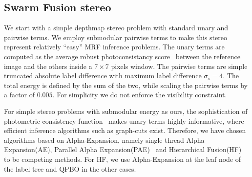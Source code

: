 \subsection{Swarm Fusion stereo}
We start with a simple depthmap stereo problem with standard unary and
pairwise terms. We employ submodular pairwise terms to make this
stereo represent relatively ``easy'' MRF inference problems.
%
The unary terms are computed as the average robust photoconsistancy
score~\cite{second_order_stereo} between the reference image and the others
inside a $7\times 7$ pixels window. The pairwise terms are simple
truncated absolute label difference with maximum label difference
$\sigma_s=4$. The total energy is defined by the sum of the two, while
scaling the pairwise terms by a factor of $0.005$. For simplicity we
do not enforce the visibility constraint.

%


\noindent For simple stereo problems with submodular energy as ours, the
sophistication of photometric consistency
function~\cite{mvs_furukawa_survey} makes unary terms highly
informative, where efficient inference algorithms such as graph-cuts
exist.
Therefore, we have chosen algorithms based on Alpha-Expansion, namely
single thread Alpha Expansion(AE), Parallel Alpha
Expansion(PAE)~\cite{fusion_moves_for_markov_random_field_optimization}
and Hierarchical Fusion(HF)~\cite{olga_hierarchical_alpha_expansion} to
be competing methods. For HF, we use Alpha-Expansion at the leaf node of
the label tree and QPBO in the other cases.


